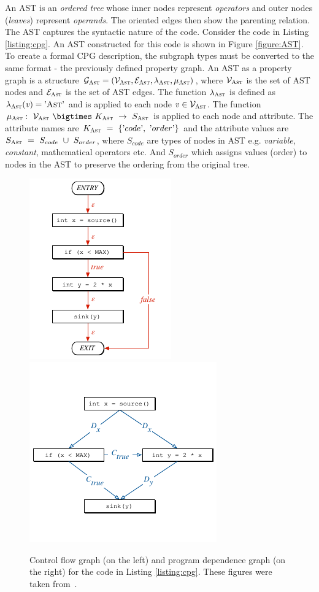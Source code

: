 An AST \cite{CPG-yamaguchi2014modeling} is an \textit{ordered tree} whose inner nodes represent \textit{operators} and outer nodes (\textit{leaves}) represent \textit{operands}. The oriented edges then show the parenting relation. The AST captures the syntactic nature of the code. Consider the code in Listing \ref{listing:cpg}. An AST constructed for this code is shown in Figure \ref{figure:AST}. To create a formal CPG description, the subgraph types must be converted to the same format - the previously defined property graph. An AST as a property graph is a structure $\mathcal{G}_{\textsc{Ast}} = (\mathcal{V}_{\textsc{Ast}}, \mathcal{E}_{\textsc{Ast}}, \lambda_{\textsc{Ast}}, \mu_{\textsc{Ast}})$, where $\mathcal{V}_{\textsc{Ast}}$ is the set of AST nodes and $\mathcal{E}_{\textsc{Ast}}$ is the set of AST edges. The function $\lambda_{\textsc{Ast}}$ is defined as $\lambda_{\textsc{Ast}}(\mathit{v}) = \textrm'\textsc{Ast}\textrm'$ and is applied to each node $\mathit{v} \in \mathcal{V}_{\textsc{Ast}}$. The function~$\mu_{\textsc{Ast}}:~\mathcal{V_{\textsc{Ast}}}~\bigtimes~K_{\textsc{Ast}}~\rightarrow~S_{\textsc{Ast}}$ is applied to each node and attribute. The attribute names are $K_{\textsc{Ast}}~=~\{\textrm'code\textrm',~\textrm'order\textrm'\}$ and the attribute values are $S_{\textsc{Ast}}~=~S_{code}~\cup~S_{order}$, where $S_{code}$ are types of nodes in AST e.g. \textit{variable}, \textit{constant}, mathematical operators etc. And $S_{order}$ which assigns values (order) to nodes in the AST to preserve the ordering from the original tree.

\begin{figure}[h]\centering
  \centering
  \includegraphics[width=0.36\linewidth]{figures/CFG.pdf}\hfill
  \includegraphics[width=0.48\linewidth]{figures/PDG.pdf}
  \caption{Control flow graph (on the left) and program dependence graph (on the right) for the code in Listing \ref{listing:cpg}. These figures were taken from~\cite{CPG-yamaguchi2014modeling}.}
  \label{figure:CFG-PDG}
\end{figure}

